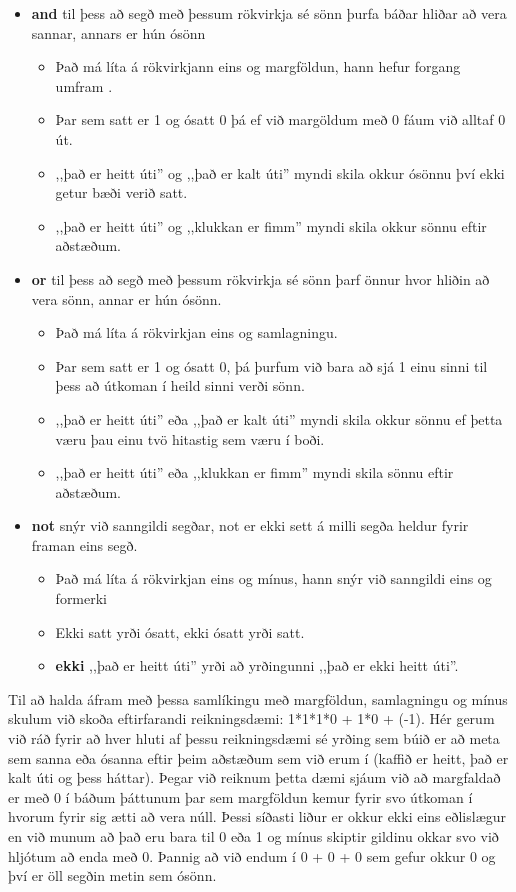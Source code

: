 \begin{itemize}
	\item \textbf{and} til þess að segð með þessum rökvirkja sé sönn þurfa báðar hliðar að vera sannar, annars er hún ósönn
	\begin{itemize}
		\item Það má líta á  rökvirkjann eins og margföldun, hann hefur forgang umfram .
		\item Þar sem satt er 1 og ósatt 0 þá ef við margöldum með 0 fáum við alltaf 0 út.
		\item ,,það er heitt úti'' og ,,það er kalt úti'' myndi skila okkur ósönnu því ekki getur bæði verið satt.
		\item ,,það er heitt úti'' og ,,klukkan er fimm'' myndi skila okkur sönnu eftir aðstæðum.
	\end{itemize}
	\item \textbf{or} til þess að segð með þessum rökvirkja sé sönn þarf önnur hvor hliðin að vera sönn, annar er hún ósönn.
	\begin{itemize}
		\item Það má líta á  rökvirkjan eins og samlagningu.
		\item Þar sem satt er 1 og ósatt 0, þá þurfum við bara að sjá 1 einu sinni til þess að útkoman í heild sinni verði sönn.
		\item ,,það er heitt úti'' eða ,,það er kalt úti'' myndi skila okkur sönnu ef þetta væru þau einu tvö hitastig sem væru í boði.
		\item ,,það er heitt úti'' eða ,,klukkan er fimm'' myndi skila sönnu eftir aðstæðum.
	\end{itemize}
	\item \textbf{not} snýr við sanngildi segðar, not er ekki sett á milli segða heldur fyrir framan eins segð.
	\begin{itemize}
		\item Það má líta á rökvirkjan  eins og mínus, hann snýr við sanngildi eins og formerki
		\item Ekki satt yrði ósatt, ekki ósatt yrði satt.
		\item \textbf{ekki} ,,það er heitt úti'' yrði að yrðingunni ,,það er ekki heitt úti''.
	\end{itemize}
\end{itemize}

\vspace{5pt}
Til að halda áfram með þessa samlíkingu með margföldun, samlagningu og mínus skulum við skoða eftirfarandi reikningsdæmi:
1*1*1*0 + 1*0 + (-1).
Hér gerum við ráð fyrir að hver hluti af þessu reikningsdæmi sé yrðing sem búið er að meta sem sanna eða ósanna eftir þeim aðstæðum sem við erum í (kaffið er heitt, það er kalt úti og þess háttar).
Þegar við reiknum þetta dæmi sjáum við að margfaldað er með 0 í báðum þáttunum þar sem margföldun kemur fyrir svo útkoman í hvorum fyrir sig ætti að vera núll.
Þessi síðasti liður er okkur ekki eins eðlislægur en við munum að það eru bara til 0 eða 1 og mínus skiptir gildinu okkar svo við hljótum að enda með 0.
Þannig að við endum í 0 + 0 + 0 sem gefur okkur 0 og því er öll segðin metin sem ósönn.

